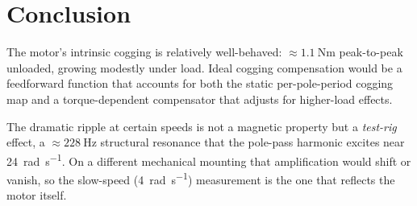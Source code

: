 \documentclass[11pt]{article}
\begin{document}
\section{Conclusion} The motor's intrinsic cogging is relatively well-behaved:
$\approx\SI{1.1}{\newton\meter}$ peak-to-peak unloaded, growing modestly under
load. Ideal cogging compensation would be a feedforward function that accounts for both the static per-pole-period cogging map and a torque-dependent compensator that adjusts for higher-load effects.

The dramatic ripple at certain speeds is not a magnetic property but a
\emph{test-rig} effect, a $\approx\SI{228}{\hertz}$ structural resonance that the pole-pass harmonic excites near \SI{24}{\radian\per\second}. On a different mechanical
mounting that amplification would shift or vanish, so the slow-speed
(\SI{4}{\radian\per\second}) measurement is the one that reflects the motor itself.
\end{document}
